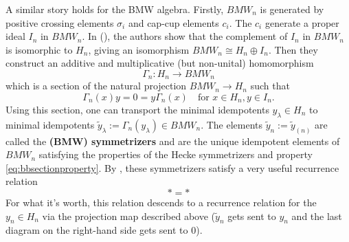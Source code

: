 A similar story holds for the BMW algebra. Firstly, $BMW_n$ is generated by positive crossing elements $\sigma_i$ and cap-cup elements $c_i$. 
The $c_i$ generate a proper ideal $I_n$ in $BMW_n$. In (), the authors show that the complement of $I_n$ in $BMW_n$ is isomorphic to $H_n$, giving an isomorphism $BMW_n \cong H_n \oplus I_n$. Then they construct an additive and multiplicative (but non-unital) homomorphism 
\begin{equation}
\Gamma_n : H_n \to BMW_n
\end{equation}
which is a section of the natural projection $BMW_n \to H_n$ such that 
\begin{equation} \label{eq:bbsectionproperty}
\Gamma_n(x)y = 0 = y \Gamma_n(x) \quad \textrm{for } x \in H_n, y \in I_n.
\end{equation}
Using this section, one can transport the minimal idempotents $y_\lambda \in H_n$ to minimal idempotents $\tilde{y}_\lambda := \Gamma_n(y_\lambda) \in BMW_n$. The elements $\tilde{y}_n := \tilde{y}_{(n)}$ are called the \textbf{(BMW) symmetrizers} and are the unique idempotent elements of $BMW_n$ satisfying the properties of the Hecke symmetrizers and property \eqref{eq:bbsectionproperty}. By , these symmetrizers satisfy a very useful recurrence relation
\begin{equation} \label{eq:shellyrecurrence}
*=*
\end{equation}
For what it's worth, this relation descends to a recurrence relation for the $y_n \in H_n$ via the projection map described above ($\tilde{y}_n$ gets sent to $y_n$ and the last diagram on the right-hand side gets sent to $0$). 


\begin{center}
\end{center}

